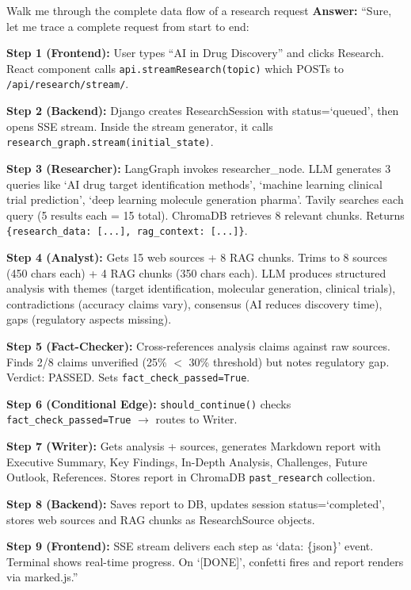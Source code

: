 \documentclass[11pt,a4paper,twoside]{report}
\begin{document}
\begin{interviewbox}{Walk me through the complete data flow of a research request}
\textbf{Answer:} ``Sure, let me trace a complete request from start to end:

\textbf{Step 1 (Frontend):} User types ``AI in Drug Discovery'' and clicks Research. React component calls \texttt{api.streamResearch(topic)} which POSTs to \texttt{/api/research/stream/}.

\textbf{Step 2 (Backend):} Django creates ResearchSession with status=`queued', then opens SSE stream. Inside the stream generator, it calls \texttt{research\_graph.stream(initial\_state)}.

\textbf{Step 3 (Researcher):} LangGraph invokes researcher\_node. LLM generates 3 queries like `AI drug target identification methods', `machine learning clinical trial prediction', `deep learning molecule generation pharma'. Tavily searches each query (5 results each = 15 total). ChromaDB retrieves 8 relevant chunks. Returns \texttt{\{research\_data: [...], rag\_context: [...]\}}.

\textbf{Step 4 (Analyst):} Gets 15 web sources + 8 RAG chunks. Trims to 8 sources (450 chars each) + 4 RAG chunks (350 chars each). LLM produces structured analysis with themes (target identification, molecular generation, clinical trials), contradictions (accuracy claims vary), consensus (AI reduces discovery time), gaps (regulatory aspects missing).

\textbf{Step 5 (Fact-Checker):} Cross-references analysis claims against raw sources. Finds 2/8 claims unverified (25\% $<$ 30\% threshold) but notes regulatory gap. Verdict: PASSED. Sets \texttt{fact\_check\_passed=True}.

\textbf{Step 6 (Conditional Edge):} \texttt{should\_continue()} checks \texttt{fact\_check\_passed=True} $\rightarrow$ routes to Writer.

\textbf{Step 7 (Writer):} Gets analysis + sources, generates Markdown report with Executive Summary, Key Findings, In-Depth Analysis, Challenges, Future Outlook, References. Stores report in ChromaDB \texttt{past\_research} collection.

\textbf{Step 8 (Backend):} Saves report to DB, updates session status=`completed', stores web sources and RAG chunks as ResearchSource objects.

\textbf{Step 9 (Frontend):} SSE stream delivers each step as `data: \{json\}' event. Terminal shows real-time progress. On `[DONE]', confetti fires and report renders via marked.js.''
\end{interviewbox}
\end{document}
